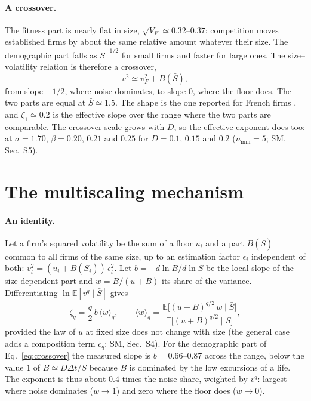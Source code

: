 \documentclass[pre,twocolumn,superscriptaddress,nofootinbib]{revtex4-2}
\newcommand{\E}{\mathbb E}
\newcommand{\Sb}{\bar S}
\begin{document}
\paragraph{A crossover.}  The fitness part is nearly flat in size,
$\sqrt{V_F}\simeq0.32$--$0.37$: competition moves established firms by about the same relative
amount whatever their size.  The demographic part falls as $\Sb^{-1/2}$ for small firms and faster for
large ones.  The size--volatility relation is therefore a crossover,
\begin{equation}
v^2\simeq v_F^2+B(\Sb),
\label{eq:crossover}
\end{equation}
from slope $-1/2$, where noise dominates, to slope $0$, where the floor does.  The two parts are equal at
$\Sb\simeq1.5$.  The shape is the one
reported for French firms \cite{fontanelli2025}, and $\zeta_1\simeq0.2$ is the effective slope over the
range where the two parts are comparable.  The crossover scale grows with $D$, so the effective
exponent does too: at $\sigma=1.70$, $\beta=0.20$, $0.21$ and $0.25$ for $D=0.1$, $0.15$ and $0.2$
($n_{\min}=5$; SM, Sec.~S5).

\section{The multiscaling mechanism}
\label{sec:multiscaling}

\paragraph{An identity.}  Let a firm's squared volatility be the sum of a floor $u_i$ and a part
$B(\Sb)$ common to all firms of the same size, up to an estimation factor $\epsilon_i$ independent of
both: $v_i^2=(u_i+B(\Sb_i))\,\epsilon_i^2$.  Let $b=-d\ln B/d\ln\Sb$ be the local slope of the size-dependent part
and $w=B/(u+B)$ its share of the variance.  Differentiating $\ln\E[v^q\mid\Sb]$ gives
\begin{equation}
\zeta_q=\frac q2\,b\,\langle w\rangle_q,\qquad
\langle w\rangle_q=\frac{\E\big[(u+B)^{q/2}\,w\mid\Sb\big]}{\E\big[(u+B)^{q/2}\mid\Sb\big]},
\label{eq:identity}
\end{equation}
provided the law of $u$ at fixed size does not change with size (the general case adds a composition
term $c_q$; SM, Sec.~S4).  For the demographic part of Eq.~\eqref{eq:crossover} the measured slope is
$b=0.66$--$0.87$ across the range, below the value $1$ of $B\simeq D\Delta t/\Sb$ because $B$ is dominated by
the low excursions of a life.  The exponent is thus about $0.4$ times the noise share, weighted by
$v^q$: largest where noise dominates ($w\to1$) and zero where the floor does ($w\to0$).
\end{document}
